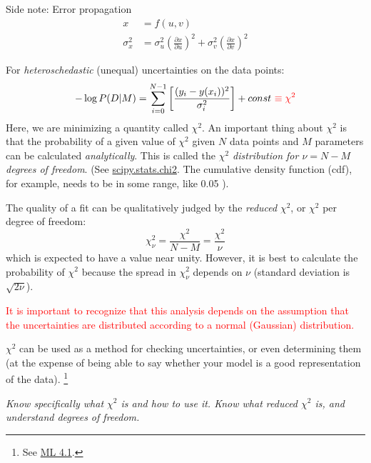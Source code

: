 \documentclass{article}
\newcommand{\test}[1]{%
    \begin{center}
        \colorbox{hl}{\parbox{0.9\textwidth}{\emph{\centering #1}}}
    \end{center}}
\begin{document}
\begin{framed}
Side note: Error propagation
\begin{align*}
    x &= f(u,v)\\
    \sigma_{x}^{2} &=
    \sigma_{u}^{2}\left(\frac{\partial{x}}{\partial{u}}\right)^{2} +
    \sigma_{v}^{2}\left(\frac{\partial{x}}{\partial{v}}\right)^{2}
\end{align*}
\end{framed}

For \textit{heteroschedastic} (unequal) uncertainties on the data points:
\[
    -\log P(D|M) = \sum_{i=0}^{N-1}{
        \left[ \frac{(y_{i}-y(x_{i}))^{2}}{\sigma_{i}^{2}} \right] }
    + const\ \textcolor{red}{\equiv \chi^{2}}
    \]
Here, we are minimizing a quantity called
$\chi^{2}$. An important thing about $\chi^{2}$ is that the probability
of a given value of $\chi^{2}$ given $N$ data points and $M$ parameters
can be calculated \textit{analytically}. This is called the
\textit{$\chi^{2}$ distribution for $\nu = N-M$ degrees of freedom}.
(See
\href{http://docs.scipy.org/doc/scipy-0.15.1/reference/generated/scipy.stats.chi2.html}
{scipy.stats.chi2}. The cumulative density function (cdf), for example,
needs to be in some range, like 0.05 ).

The quality of a fit can be qualitatively judged by the
\textit{reduced} $\chi^{2}$, or $\chi^{2}$ per degree of freedom:
\[
    \chi_{\nu}^{2} = \frac{\chi^{2}}{N-M} = \frac{\chi^{2}}{\nu}
    \]
which is expected to have a value near unity. However, it is best to calculate
the probability of $\chi^{2}$ because the spread in $\chi_{\nu}^{2}$ depends
on $\nu$ (standard deviation is $\sqrt{2\nu}$).

\textcolor{red}{It is important to recognize that this analysis depends
on the assumption that the uncertainties are distributed according to
a normal (Gaussian) distribution.}

$\chi^{2}$ can be used as a method for checking uncertainties, or even
determining them (at the expense of being able to say whether your
model is a good representation of the data).
\footnote{
    See \href{http://astronomy.nmsu.edu/holtz/a575/images/ML4.1.png}{ML 4.1}.
}

\test{Know specifically what $\chi^{2}$ is and how to use it.  Know what reduced
$\chi^{2}$ is, and understand degrees of freedom.}
\end{document}
